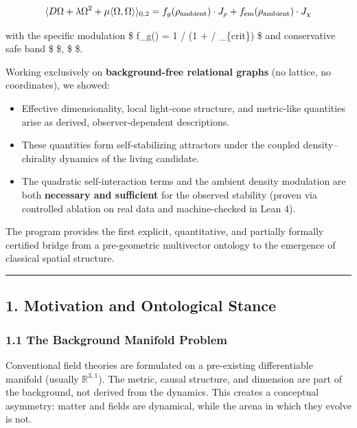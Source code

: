 \documentclass[
  11pt,
  a4paper,
]{article}
\providecommand{\tightlist}{%
  \setlength{\itemsep}{0pt}\setlength{\parskip}{0pt}}
\begin{document}
\[
\langle D \Omega + \lambda \Omega^2 + \mu \langle \Omega, \Omega \rangle \rangle_{0,2}
= f_g(\rho_{\rm ambient}) \cdot J_\rho + f_{\rm em}(\rho_{\rm ambient}) \cdot J_\chi
\]

with the specific modulation \$ f\_g(\rho) = 1 / (1 + \rho /
\rho\_\{\rm crit\}) \$ and conservative safe band \$
\textbar{}\lambda\textbar{}  \$, \$ \textbar{}\mu\textbar{}
 \$.

Working exclusively on \textbf{background-free relational graphs} (no
lattice, no coordinates), we showed:

\begin{itemize}
\tightlist
\item
  Effective dimensionality, local light-cone structure, and metric-like
  quantities arise as derived, observer-dependent descriptions.
\item
  These quantities form self-stabilizing attractors under the coupled
  density--chirality dynamics of the living candidate.
\item
  The quadratic self-interaction terms and the ambient density
  modulation are both \textbf{necessary and sufficient} for the observed
  stability (proven via controlled ablation on real data and
  machine-checked in Lean 4).
\end{itemize}

The program provides the first explicit, quantitative, and partially
formally certified bridge from a pre-geometric multivector ontology to
the emergence of classical spatial structure.

\begin{center}\rule{0.5\linewidth}{0.5pt}\end{center}

\subsection{1. Motivation and Ontological
Stance}\label{motivation-and-ontological-stance}

\subsubsection{1.1 The Background Manifold
Problem}\label{the-background-manifold-problem}

Conventional field theories are formulated on a pre-existing
differentiable manifold (usually \(\mathbb{R}^{3,1}\)). The metric,
causal structure, and dimension are part of the background, not derived
from the dynamics. This creates a conceptual asymmetry: matter and
fields are dynamical, while the arena in which they evolve is not.
\end{document}
